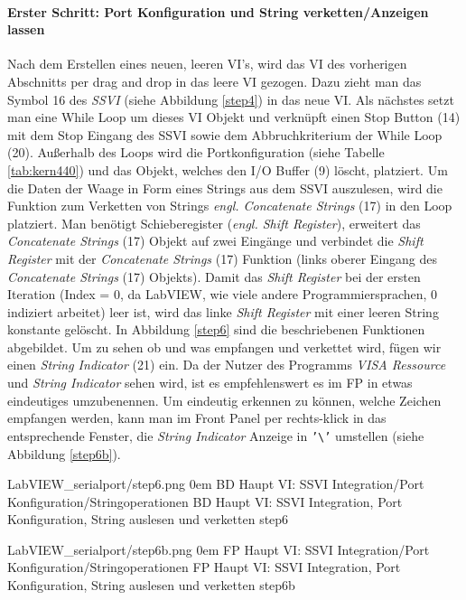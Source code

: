 \paragraph{Erster Schritt: Port Konfiguration und String verketten/Anzeigen lassen} Nach dem Erstellen eines neuen, leeren VI's, wird das VI des vorherigen Abschnitts per drag and drop in das leere VI gezogen. Dazu zieht man das Symbol 16 des \textit{SSVI} (siehe Abbildung \ref{step4}) in das neue VI. Als nächstes setzt man eine While Loop um dieses VI Objekt und verknüpft einen Stop Button (14) mit dem Stop Eingang des SSVI sowie dem Abbruchkriterium der While Loop (20). Außerhalb des Loops wird die Portkonfiguration (siehe Tabelle \ref{tab:kern440}) und das Objekt, welches den I/O Buffer (9) löscht, platziert. Um die Daten der Waage in Form eines Strings aus dem SSVI auszulesen, wird die Funktion zum Verketten von Strings \textit{engl. Concatenate Strings} (17) in den Loop platziert. Man benötigt Schieberegister (\textit{engl. Shift Register}), erweitert das \textit{Concatenate Strings} (17) Objekt auf zwei Eingänge und verbindet die \textit{Shift Register} mit der \textit{Concatenate Strings} (17) Funktion (links oberer Eingang des \textit{Concatenate Strings} (17) Objekts). Damit das \textit{Shift Register} bei der ersten Iteration (Index = 0, da LabVIEW, wie viele andere Programmiersprachen, 0 indiziert arbeitet) leer ist, wird das linke \textit{Shift Register} mit einer leeren String konstante gelöscht. In Abbildung \ref{step6} sind die beschriebenen Funktionen abgebildet. Um zu sehen ob und was empfangen und verkettet wird, fügen wir einen \textit{String Indicator} (21) ein. Da der Nutzer des Programms \textit{VISA Ressource} und \textit{String Indicator} sehen wird, ist es empfehlenswert es im FP in etwas eindeutiges umzubenennen. Um eindeutig erkennen zu können, welche Zeichen empfangen werden, kann man im Front Panel per rechts-klick in das entsprechende Fenster, die \textit{String Indicator} Anzeige in \texttt{'\textbackslash'} umstellen (siehe Abbildung \ref{step6b}).

{LabVIEW_serialport/step6.png}
{0em}
{BD Haupt VI: SSVI Integration/Port Konfiguration/String\-operationen}
{BD Haupt VI: SSVI Integration, Port Konfiguration, String auslesen und \mbox{verketten}}
{step6}



{LabVIEW_serialport/step6b.png}
{0em}
{FP Haupt VI: SSVI Integration/Port Konfiguration/String\-operationen}
{FP Haupt VI: SSVI Integration, Port Konfiguration, String auslesen und \mbox{verketten}}
{step6b}

